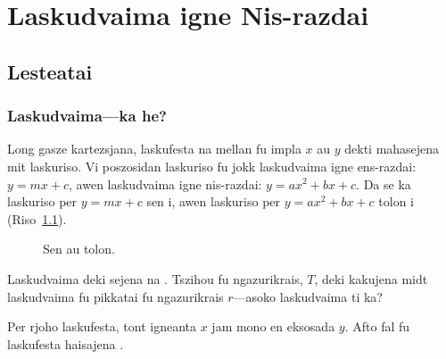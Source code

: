 \chapter{Laskudvaima igne Nis-razdai}

\section{Lesteatai}

\subsection{Laskudvaima---ka he?}

Long gasze kartezsjana, laskufesta na mellan fu impla \(x\) au \(y\) dekti mahasejena mit laskuriso.
Vi poszosidan laskuriso fu jokk laskudvaima igne ens-razdai: \(y = mx + c\), awen laskudvaima igne
nis-razdai: \(y = ax^2 + bx + c\). Da se ka laskuriso per \(y = mx + c\) sen i, awen laskuriso per
\(y = ax^2 + bx + c\) tolon i (Riso~\ref{fig:sen-au-tolon}).

\begin{figure}[htpb]
  \centering
  \hfill
  \hfill
  \hfill
  \caption{Sen au tolon.}
  \label{fig:sen-au-tolon}
\end{figure}

\begin{remark}
  Laskudvaima deki sejena na . Tszihou fu 
  ngazurikrais, \(T\), deki kakujena midt laskudvaima fu pikkatai
  fu ngazurikrais \(r\)---asoko laskudvaima ti ka? 
\end{remark}


Per rjoho laskufesta, tont igneanta \(x\) jam mono en eksosada \(y\).
Afto fal fu laskufesta haisajena .

